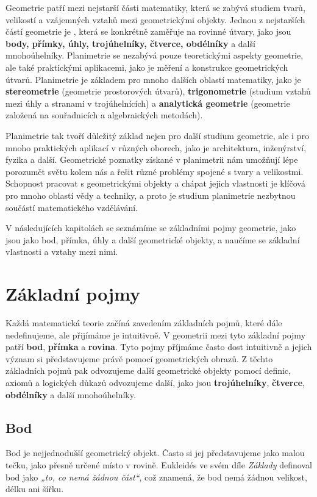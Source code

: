 \documentclass[12pt,a4paper]{article}
\begin{document}
Geometrie patří mezi nejstarší části matematiky, která se zabývá studiem tvarů,
velikostí a vzájemných vztahů mezi geometrickými objekty. 
Jednou z nejstarších částí geometrie je , která se konkrétně zaměřuje na rovinné útvary, 
jako jsou \textbf{body, přímky, úhly, trojúhelníky, čtverce, obdélníky} a další mnohoúhelníky.
Planimetrie se nezabývá pouze teoretickými aspekty geometrie,
ale také praktickými aplikacemi, jako je měření a konstrukce geometrických útvarů.
Planimetrie je základem pro mnoho dalších oblastí matematiky, jako je \textbf{stereometrie} (geometrie prostorových útvarů),
\textbf{trigonometrie} (studium vztahů mezi úhly a stranami v trojúhelnících) a \textbf{analytická geometrie} (geometrie založená na souřadnicích a algebraických metodách).

Planimetrie tak tvoří důležitý základ nejen pro další studium geometrie, ale i pro mnoho praktických aplikací v různých oborech, 
jako je architektura, inženýrství, fyzika a další.
Geometrické poznatky získané v planimetrii nám umožňují lépe porozumět světu kolem nás a řešit různé problémy spojené s tvary a velikostmi.
Schopnost pracovat s geometrickými objekty a chápat jejich vlastnosti je klíčová pro mnoho oblastí vědy a techniky, 
a proto je studium planimetrie nezbytnou součástí matematického vzdělávání.

V následujících kapitolách se seznámíme se základními pojmy geometrie, jako jsou jako bod, přímka, úhly a další geometrické objekty, 
a naučíme se základní vlastnosti a vztahy mezi nimi.



\section{Základní pojmy}

Každá matematická teorie začíná zavedením základních pojmů, které dále nedefinujeme,
ale přijímáme je intuitivně. V geometrii mezi tyto základní pojmy patří
\textbf{bod}, \textbf{přímka} a \textbf{rovina}.
Tyto pojmy příjmáme často dost intuitivně a jejich význam si představujeme právě pomocí geometrických obrazů.
Z těchto základních pojmů pak odvozujeme další geometrické objekty pomocí definic, 
axiomů a logických důkazů odvozujeme další, jako jsou \textbf{trojúhelníky}, \textbf{čtverce}, \textbf{obdélníky} a další mnohoúhelníky.

\subsection{Bod}
Bod je nejjednodušší geometrický objekt. Často si jej představujeme jako malou tečku, jako přesně určené místo v rovině.
Eukleidés ve svém díle \textit{Základy} definoval bod jako \emph{„to, co nemá žádnou část“}, což znamená, že bod nemá žádnou velikost, délku ani šířku.
\end{document}
